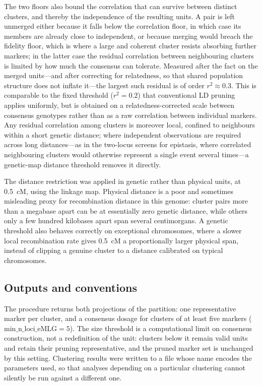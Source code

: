 \documentclass[11pt]{article}
\begin{document}
The two floors also bound the correlation that can survive between distinct
clusters, and thereby the independence of the resulting units. A pair is left
unmerged either because it falls below the correlation floor, in which case its
members are already close to independent, or because merging would breach the
fidelity floor, which is where a large and coherent cluster resists absorbing further
markers; in the latter case the residual correlation between neighbouring clusters is
limited by how much the consensus can tolerate. Measured after the fact on the
merged units---and after correcting for relatedness, so that shared population
structure does not inflate it---the largest such residual is of order $r^2 \approx
0.3$. This is comparable to the fixed threshold ($r^2 = 0.2$) that conventional LD
pruning applies uniformly, but is obtained on a relatedness-corrected scale between
consensus genotypes rather than as a raw correlation between individual markers. Any
residual correlation among clusters is moreover local, confined to neighbours within
a short genetic distance; where independent observations are required across long
distances---as in the two-locus screens for epistasis, where correlated neighbouring
clusters would otherwise represent a single event several times---a genetic-map
distance threshold removes it directly.

The distance restriction was applied in genetic rather than physical units, at
0.5~cM, using the linkage map. Physical distance is a poor and sometimes
misleading proxy for recombination distance in this genome: cluster pairs more
than a megabase apart can be at essentially zero genetic distance, while others
only a few hundred kilobases apart span several centimorgans. A genetic
threshold also behaves correctly on exceptional chromosomes, where a slower
local recombination rate gives 0.5~cM a proportionally larger physical span,
instead of clipping a genuine cluster to a distance calibrated on typical
chromosomes.

\subsection{Outputs and conventions}
The procedure returns both projections of the partition: one representative
marker per cluster, and a consensus dosage for clusters of at least five markers
($\mathrm{min\_n\_loci\_eMLG} = 5$). The size threshold is a computational
limit on consensus construction, not a redefinition of the unit: clusters below
it remain valid units and retain their pruning representative, and the pruned
marker set is unchanged by this setting. Clustering results were written to a
file whose name encodes the parameters used, so that analyses depending on a
particular clustering cannot silently be run against a different one.
\end{document}
